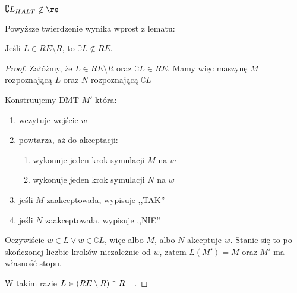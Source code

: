 \begin{theorem}
\(\complement L_{HALT} \not \in \re\)
\end{theorem}

Powyższe twierdzenie wynika wprost z lematu:

\begin{lemma}
    Jeśli \( L \in RE \setminus R \), to \( \complement{L} \not \in RE\).
\end{lemma}
\begin{proof}
    Załóżmy, że \( L \in RE \setminus R \) oraz \( \complement{L} \in RE\). 
    Mamy więc maszynę \( M \) rozpoznającą \( L \) oraz \( N \) rozpoznającą \( \complement{L} \)
    
    Konstruujemy DMT \( M' \) która:
    \begin{enumerate}
        \item wczytuje wejście \( w \)
        \item powtarza, aż do akceptacji:
        \begin{enumerate}
            \item wykonuje jeden krok symulacji \( M \) na \( w \)
            \item wykonuje jeden krok symulacji \( N \) na \( w \)
        \end{enumerate}
        \item jeśli \( M \) zaakceptowała, wypisuje ,,TAK''
        \item jeśli \( N \) zaakceptowała, wypisuje ,,NIE''
    \end{enumerate}
    
    Oczywiście \( w \in L \lor w \in \complement{L} \), więc albo \( M \), albo \(N\) akceptuje \( w \).
    Stanie się to po skończonej liczbie kroków niezależnie od \( w \), zatem \( L(M') = M \) oraz \( M' \) ma własność stopu.
    
    W takim razie \( L \in (RE \setminus R) \cap R = \empty \).
\end{proof}